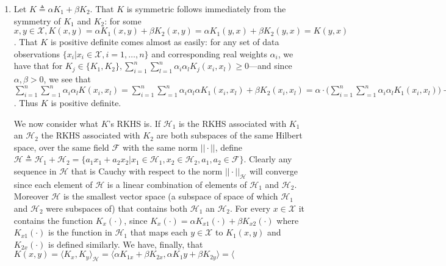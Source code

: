 \documentclass[12pt]{article}
\newenvironment{exercise}[2][Exercise]{\begin{trivlist}
\item[\hskip \labelsep {\bfseries #1}\hskip \labelsep {\bfseries #2.}]}{\end{trivlist}}
\begin{document}
\begin{exercise}{1}
\begin{enumerate}
	\end{enumerate}
\end{exercise}

\begin{exercise}{2}
	\begin{enumerate}
		\item Let $K \triangleq \alpha K_1 + \beta K_2$. That $K$ is symmetric follows immediately from the symmetry of $K_1$ and $K_2$: for some $x, y \in \mathcal{X}, K(x,y) = \alpha K_1(x,y) + \beta K_2(x,y) = \alpha K_1(y,x) + \beta K_2(y,x) = K(y,x)$. That $K$ is positive definite comes almost as easily: for any set of data observations $\{x_i | x_i \in \mathcal{X}, i=1,\ldots,n\}$ and corresponding real weights $\alpha_i$, we have that for $K_j \in \{K_1, K_2 \}, \sum_{i=1}^n \sum_{l=1}^n \alpha_i \alpha_l K_j(x_i, x_l) \geq 0$---and since $\alpha, \beta > 0$, we see that $\sum_{i=1}^n \sum_{=1}^n \alpha_i \alpha_l K(x_i, x_l) = \sum_{i=1}^n \sum_{=1}^n \alpha_i \alpha_l \alpha K_1(x_i, x_l) + \beta K_2(x_i, x_l) = \alpha \cdot \big( \sum_{i=1}^n \sum_{=1}^n \alpha_i \alpha_l K_1(x_i, x_l)\big) + \beta \cdot \big(\sum_{i=1}^n \sum_{=1}^n \alpha_i \alpha_l K_2(x_i, x_l)\big) \geq 0$. Thus $K$ is positive definite.

			We now consider what $K$'s RKHS is. If $\mathcal{H}_1$ is the RKHS associated with $K_1$ an $\mathcal{H}_2$ the RKHS associated with $K_2$ are both subspaces of the same Hilbert space, over the same field $\mathcal{F}$ with the same norm $|| \cdot ||$, define $\mathcal{H} \triangleq \mathcal{H}_1 + \mathcal{H}_2 = \{a_1 x_1 + a_2 x_2 | x_1 \in \mathcal{H}_1, x_2 \in \mathcal{H}_2, a_1,a_2 \in \mathcal{F}\}$. Clearly any sequence in $\mathcal{H}$ that is Cauchy with respect to the norm $|| \cdot ||_\mathcal{H}$  will converge since each element of $\mathcal{H}$ is a linear combination of elements of $\mathcal{H}_1$ and $\mathcal{H}_2$. Moreover $\mathcal{H}$ is the smallest vector space (a subspace of space of which $\mathcal{H}_1$ and $\mathcal{H}_2$ were subspaces of) that contains both $\mathcal{H}_1$ an $\mathcal{H}_2$. For every $x \in \mathcal{X}$ it contains the function $K_x(\cdot)$, since $K_x(\cdot) = \alpha K_{x1}(\cdot) + \beta K_{x2} (\cdot)$ where $K_{x1}(\cdot)$ is the function in $\mathcal{H}_1$ that maps each $y \in \mathcal{X}$ to $K_1(x,y)$ and $K_{2x}(\cdot)$ is defined similarly. We have, finally, that $K(x,y) = \langle K_x, K_y \rangle_{\mathcal{H}} = \langle \alpha K_{1x} + \beta K_{2x}, \alpha K_1y + \beta K_{2y} \rangle = \langle$


\end{enumerate}
\end{exercise}
\end{document}
